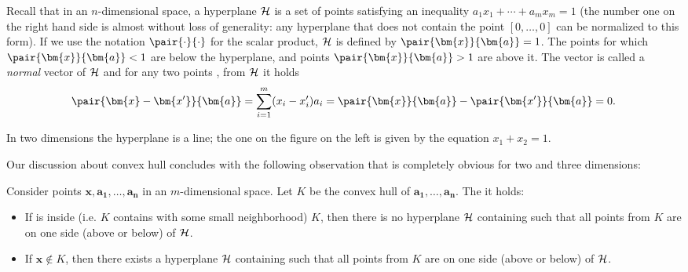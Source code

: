 \begin{shaded}
\begin{minipage}[t]{6cm}
\begin{center}

\end{center}

\end{minipage}\hspace*{1cm}\begin{minipage}[t]{\textwidth-7cm}
  \vspace{0pt}
  Recall that in an $n$-dimensional space, a hyperplane $\cal H$ is a set of points  satisfying
  an inequality $a_1x_1+\cdots+a_mx_m=1$ (the number one on the right hand side is almost without loss of
  generality: any hyperplane that does not contain the point  $[0,\ldots,0]$ can be normalized to this form).
  If we use the notation  $\pair{\cdot}{\cdot}$ for the scalar product, $\cal H$ is defined by 
   $\pair{\bm{x}}{\bm{a}}=1$. The points for which  $\pair{\bm{x}}{\bm{a}}<1$ are below the hyperplane,
   and points $\pair{\bm{x}}{\bm{a}}>1$ are above it. The vector  is called a {\em normal } vector
   of $\cal H$ and for any two points ,  from $\cal H$ it holds 
$$\pair{\bm{x}-\bm{x'}}{\bm{a}}=\sum_{i=1}^m(x_i-x'_i)a_i=\pair{\bm{x}}{\bm{a}}-\pair{\bm{x'}}{\bm{a}}=0.$$

\noindent
In two dimensions the hyperplane is a line; the one on the figure on the left is given by the equation
$x_1+x_2=1$.

\end{minipage}

\vskip 2mm
\noindent
Our discussion about convex hull concludes with the following observation that is completely obvious for two and 
three dimensions:

\begin{lema}
  \label{lm:KO:2}
  Consider points  $\bm{x},\bm{a_1},\ldots,\bm{a_n}$ in an $m$-dimensional space. 
  Let $K$ be the convex hull of 
  $\bm{a_1},\ldots,\bm{a_n}$. The it holds:
  \begin{itemize}
    \item 
      If  is inside (i.e. $K$ contains  with some small neighborhood) $K$, 
      then there is no hyperplane $\cal H$ 
      containing  such that all points from $K$ are on one side
      (above or below) of $\cal H$.
    \item 
      If $\bm{x} \not\in K$,
      then there exists a hyperplane $\cal H$
      containing  such that all points from $K$ are on one side
      (above or below) of $\cal H$.
  \end{itemize}
\end{lema}


\end{shaded}
